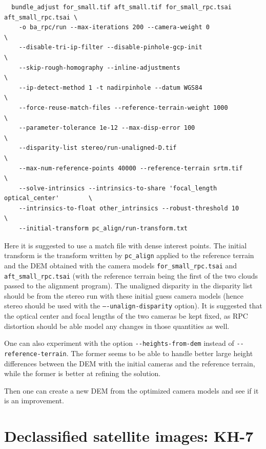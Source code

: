 \begin{verbatim}
  bundle_adjust for_small.tif aft_small.tif for_small_rpc.tsai aft_small_rpc.tsai \
    -o ba_rpc/run --max-iterations 200 --camera-weight 0                          \
    --disable-tri-ip-filter --disable-pinhole-gcp-init                            \
    --skip-rough-homography --inline-adjustments                                  \
    --ip-detect-method 1 -t nadirpinhole --datum WGS84                            \
    --force-reuse-match-files --reference-terrain-weight 1000                     \
    --parameter-tolerance 1e-12 --max-disp-error 100                              \
    --disparity-list stereo/run-unaligned-D.tif                                   \
    --max-num-reference-points 40000 --reference-terrain srtm.tif                 \
    --solve-intrinsics --intrinsics-to-share 'focal_length optical_center'        \
    --intrinsics-to-float other_intrinsics --robust-threshold 10                  \
    --initial-transform pc_align/run-transform.txt
\end{verbatim}

Here it is suggested to use a match file with dense interest points.
The initial transform is the transform written by \texttt{pc\_align}
applied to the reference terrain and the DEM obtained with the camera
models \texttt{for\_small\_rpc.tsai} and \texttt{aft\_small\_rpc.tsai}
(with the reference terrain being the first of the two clouds passed to
the alignment program). The unaligned disparity in the disparity list
should be from the stereo run with these initial guess camera models
(hence stereo should be used with the \texttt{--\/-unalign-disparity}
option). It is suggested that the optical center and focal lengths of
the two cameras be kept fixed, as RPC distortion should be able model
any changes in those quantities as well.

One can also experiment with the option \texttt{-\/-heights-from-dem}
instead of \texttt{-\/-reference-terrain}. The former seems to be able
to handle better large height differences between the 
DEM with the initial cameras and the reference terrain, while the 
former is better at refining the solution. 

Then one can create a new DEM from the optimized camera models and see
if it is an improvement.

\section{Declassified satellite images: KH-7}
\label{kh7}

